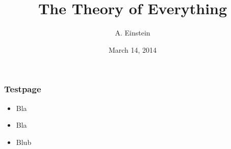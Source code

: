 \documentclass{beamer}
\title{The Theory of Everything}
\author{A. Einstein}
\date[14/3/14]{March 14, 2014}
\institute{University of Magratea}
\begin{document}
\ECFAugie

\begin{frame}[plain]
    \maketitle
\end{frame}

\begin{frame}[t]
    \frametitle{Testpage}
    \begin{itemize}
        \item Bla
        \item Bla
        \item Blub
    \end{itemize}
\end{frame}
\end{document}
